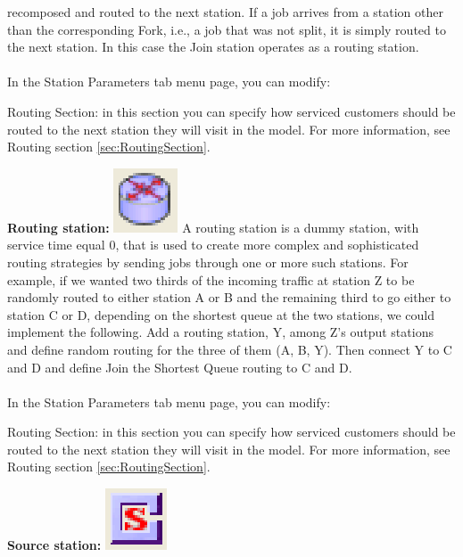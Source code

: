 \begin{enumerate*}
recomposed and routed to the next station. If a job arrives from a station other than the corresponding Fork, i.e., a job that was not split, it is simply routed to the next station. In this case the Join station operates as a routing station.\\\\
In the Station Parameters tab menu page, you can modify:
\begin{description*}
\item[Routing Section:] in this section you can specify how serviced customers should be routed to the next station they will visit in the model.
For more information, see Routing section \autoref{sec:RoutingSection}.
\end{description*}
\item \textbf{Routing station:} \includegraphics[scale=1]{img/jsim/load_splitter.eps}
A routing station is a dummy station, with service time equal 0, that is used to create more complex and sophisticated routing strategies by sending jobs through one or more such stations. For example, if we wanted two thirds of the incoming traffic at station Z to be randomly routed to either station A or B and the remaining third to go either to station C or D, depending on the shortest queue at the two stations, we could implement the following. Add a routing station, Y, among Z's output stations and define random routing for the three of them (A, B, Y).
Then connect Y to C and D and define Join the Shortest Queue routing to C and D.\\\\
In the Station Parameters tab menu page, you can modify:
\begin{description*}
\item[Routing Section:] in this section you can specify how serviced customers should be routed to the next station they will visit in the model.
For more information, see Routing section \autoref{sec:RoutingSection}.
\end{description*}
\item \textbf{Source station:} \includegraphics[scale=1]{img/jsim/source.eps}

\end{enumerate*}
